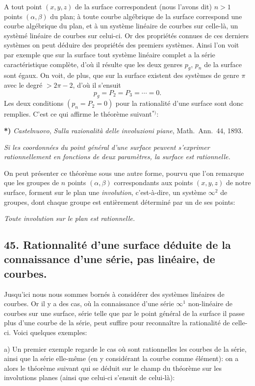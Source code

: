 \documentclass{article}
\begin{document}
A tout point $(x, y, z)$ de la surface correspondent (nous l'avons dit) $n > 1$ points $(\alpha, \beta)$ du plan; à toute courbe algébrique de la surface correspond une courbe algébrique du plan, et à un système linéaire de courbes sur celle-là, un systèmé linéaire de courbes sur celui-ci. Or des propriétés connues de ces derniers systèmes on peut déduire des propriétés des premiers systèmes. Ainsi l'on voit par exemple que sur la surface tout système linéaire complet a la série caractéristique complète, d'où il résulte que les deux genres $p_{g}$, $p_{n}$ de la surface sont égaux. On voit, de plus, que sur la surface existent des systèmes de genre $\pi$ avec le degré $> 2\pi - 2$, d'où il s'ensuit
\[ p_{g} = P_{2} = P_{3} = \cdots = 0. \]
Les deux conditions $(p_{n} = P_{2} = 0)$ pour la rationalité d'une surface sont donc remplies. C'est ce qui affirme le théorème suivant${}^{*)}$:

\textbf{*)} \emph{Castelnuovo}, \emph{Sulla razionalità delle involuzioni piane}, Math.\ Ann.\ 44, 1893.


\emph{Si les coordonnées du point général d'une surface peuvent s'exprimer rationnellement en fonctions de deux paramètres, la surface est rationnelle.}

On peut présenter ce théorème sous une autre forme, pourvu que l'on remarque que les groupes de $n$ points $(\alpha, \beta)$ correspondants aux points $(x, y, z)$ de notre surface, forment sur le plan une \emph{involution}, c'est-à-dire, un système $\infty^{2}$ de groupes, dont chaque groupe est entièrement déterminé par un de ses points:

\emph{Toute involution sur le plan est rationnelle.}

\subsection*{45. Rationnalité d'une surface déduite de la connaissance d'une série, pas linéaire, de courbes.}

Jusqu'ici nous nous sommes bornés à considérer des systèmes linéaires de courbes. Or il y a des cas, où la connaissance d'une série $\infty^{1}$ non-linéaire de courbes sur une surface, série telle que par le point général de la surface il passe plus d'une courbe de la série, peut suffire pour reconnaître la rationalité de celle-ci. Voici quelques exemples:

a) Un premier exemple regarde le cas où sont rationnelles les courbes de la série, ainsi que la série elle-même (en y considérant la courbe comme élément): on a alors le théorème suivant qui se déduit sur le champ du théorème sur les involutions planes (ainsi que celui-ci s'ensuit de celui-là):
\end{document}
